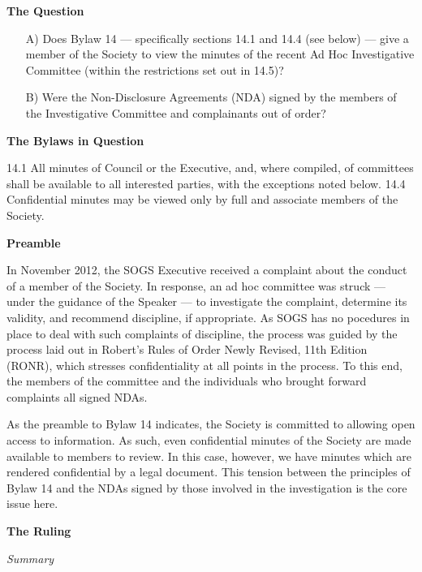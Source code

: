 \begin{longenum}[ label*=\arabic*., align=left]
\item \textbf{The Question}

\begin{itemize}
\item[A)] Does Bylaw 14 --- specifically sections 14.1 and 14.4 (see below) --- give a member of the Society to view the minutes of the recent Ad Hoc Investigative Committee (within the restrictions set out in 14.5)?
\item[B)]  Were the Non-Disclosure Agreements (NDA) signed by the members of the Investigative Committee and complainants out of order?
\end{itemize}

\item \textbf{The Bylaws in Question}

14.1 All minutes of Council or the Executive, and,  where compiled,  of committees shall be available to all interested parties, with the exceptions noted below.
14.4 Confidential minutes may be viewed only by full and associate members of the Society.

\item \textbf{Preamble}

In November 2012, the SOGS Executive received a complaint about the conduct of a member of the Society. In response, an ad hoc committee was struck --- under the guidance of the Speaker --- to investigate the complaint, determine its validity, and recommend discipline, if appropriate. As SOGS has no pocedures in place to deal with such complaints of discipline, the process was guided by the process laid out in Robert's Rules of Order Newly Revised, 11th Edition (RONR), which stresses confidentiality at all points in the process. To this end, the members of the committee and the individuals who brought forward complaints all signed NDAs.

As the preamble to Bylaw 14 indicates, the Society is committed to allowing open access to information. As such, even confidential minutes of the Society are made available to members to review. In this case, however, we have minutes which are rendered confidential by a legal document. This tension between the principles of Bylaw 14 and the NDAs signed by those involved in the investigation is the core issue here.

\item \textbf{The Ruling}
\begin{longenum}
\item \textit{Summary}


\end{longenum}
\end{longenum}
